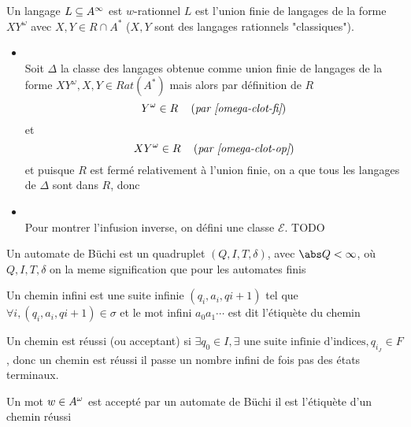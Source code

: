 \begin{prop}
	Un langage $L \subseteq A^{\infty}$ est $w$-rationnel \ssi $L$ est l'union finie de langages
	de la forme $XY^{\omega}$ avec $X,Y \in R \cap A^*$ ($X,Y$ sont des langages rationnels "classiques").
\end{prop}

\begin{proofI}

	\begin{itemize}
		\item {} \\
		      Soit $\Delta$ la classe des langages obtenue comme union finie de langages de la forme $XY^{\omega}, X,Y \in Rat(A^*)$
		      mais alors par définition de $R$
		      $$Y^{\omega} \in R \quad\left(\textit{par \ref{omega-clot-fi}}\right)$$
		      et
		      $$XY^{\omega} \in R \quad\left(\textit{par \ref{omega-clot-op}}\right)$$
		      et puisque $R$ est fermé relativement à l'union finie, on a que tous les langages de $\Delta$ sont dans $R$, donc
		\item {} \\

		      Pour montrer l'infusion inverse, on défini une classe $\mathcal{E}$.
		      TODO
	\end{itemize}
\end{proofI}

\begin{definition}
	Un automate de Büchi est un quadruplet $(Q,I,T,\delta)$, avec $\abs Q < \infty$, où
	$Q,I,T,\delta$ on la meme signification que pour les automates finis
\end{definition}

\begin{definition}
	Un chemin infini est une suite infinie $(q_i,a_i,q{i+1})$ tel que $\forall i, (q_i,a_i,q{i+1}) \in \sigma$ et le mot
	infini $a_0a_1\cdots$ est dit l'étiquète du chemin
\end{definition}


\begin{definition}
	Un chemin est réussi (ou acceptant) si $\exists q_0 \in I, \exists \text{ une suite infinie d'indices}, q_{i_J} \in F$,
	donc un chemin est réussi \ssi il passe un nombre infini de fois pas des états terminaux.
\end{definition}

\begin{definition}
	Un mot $w \in A^{\omega}$ est accepté par un automate de Büchi \ssi il est l'étiquète d'un chemin réussi
\end{definition}


